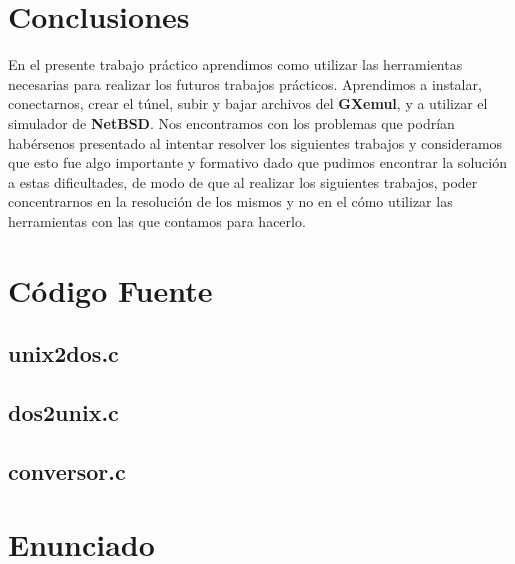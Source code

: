 \documentclass[a4paper,10pt]{article}
\begin{document}
\section{Conclusiones}
     En el presente trabajo pr\'actico aprendimos como utilizar las herramientas necesarias para realizar los futuros trabajos
     pr\'acticos. Aprendimos a instalar, conectarnos, crear el t\'unel, subir y bajar archivos del {\bf GXemul}, y a utilizar 
     el simulador de {\bf NetBSD}. Nos encontramos con los problemas que podr\'ian hab\'ersenos presentado
     al intentar resolver los siguientes trabajos y consideramos que esto fue algo importante y formativo dado que pudimos encontrar la soluci\'on
     a estas dificultades, de modo de que al realizar los siguientes trabajos, poder concentrarnos en la resoluci\'on de los mismos y no en el c\'omo
     utilizar las herramientas con las que contamos para hacerlo.
     


\appendix
\newpage
\section{C\'odigo Fuente}
  \subsection{unix2dos.c}
    \lstset{numbers=left, frame=single, breaklines=true}
    
  \subsection{dos2unix.c}
    \lstset{numbers=left, frame=single, breaklines=true}
    
  \subsection{conversor.c}
    \lstset{numbers=left, frame=single, breaklines=true}
    

\newpage
\section{Enunciado}

\end{document}

